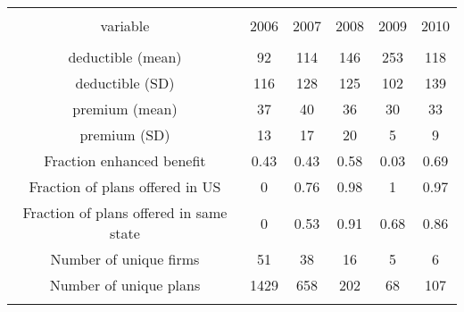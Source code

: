
\begin{table}[!htbp] \centering 
  \caption{} 
  \label{} 
\begin{tabular}{@{\extracolsep{5pt}} cccccc} 
\\[-1.8ex]\hline 
\hline \\[-1.8ex] 
variable & 2006 & 2007 & 2008 & 2009 & 2010 \\ 
\hline \\[-1.8ex] 
deductible (mean) & 92 & 114 & 146 & 253 & 118 \\ 
deductible (SD) & 116 & 128 & 125 & 102 & 139 \\ 
premium (mean) & 37 & 40 & 36 & 30 & 33 \\ 
premium (SD) & 13 & 17 & 20 & 5 & 9 \\ 
Fraction enhanced benefit & 0.43 & 0.43 & 0.58 & 0.03 & 0.69 \\ 
Fraction of plans offered in US & 0 & 0.76 & 0.98 & 1 & 0.97 \\ 
Fraction of plans offered in same state & 0 & 0.53 & 0.91 & 0.68 & 0.86 \\ 
Number of unique firms & 51 & 38 & 16 & 5 & 6 \\ 
Number of unique plans & 1429 & 658 & 202 & 68 & 107 \\ 
\hline \\[-1.8ex] 
\end{tabular} 
\end{table} 
